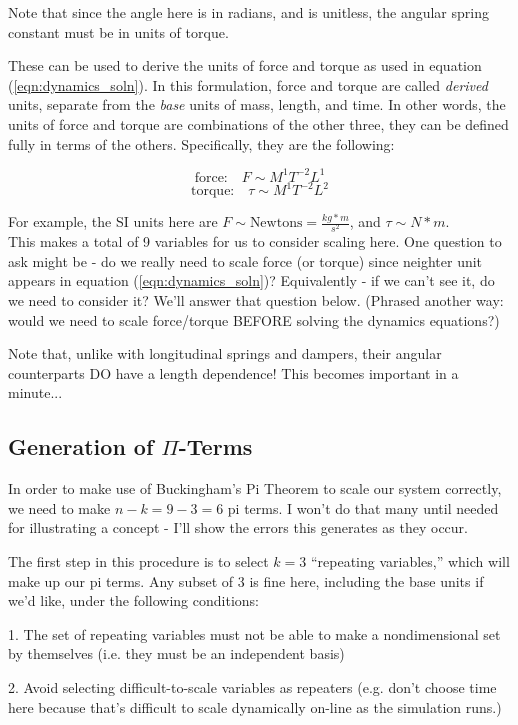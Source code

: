 \documentclass[12pt,letterpaper]{article}
\begin{document}
Note that since the angle here is in radians, and is unitless, the angular spring constant must be in units of torque.

These can be used to derive the units of force and torque as used in equation (\ref{eqn:dynamics_soln}).
In this formulation, force and torque are called {\it derived} units, separate from the {\it base} units of mass, length, and time.
In other words, the units of force and torque are combinations of the other three, they can be defined fully in terms of the others.
Specifically, they are the following:

\[
\text{force:} \quad F \sim M^1 T^{-2} L^1 
\]
\[
\text{torque:} \quad \tau \sim M^1 T^{-2} L^2 
\]

For example, the SI units here are $F \sim \text{Newtons} = \frac{kg*m}{s^2}$, and $\tau \sim N*m$. \\

This makes a total of 9 variables for us to consider scaling here.
One question to ask might be - do we really need to scale force (or torque) since neighter unit appears in equation (\ref{eqn:dynamics_soln})?
Equivalently - if we can't see it, do we need to consider it?
We'll answer that question below.
(Phrased another way: would we need to scale force/torque BEFORE solving the dynamics equations?)

Note that, unlike with longitudinal springs and dampers, their angular counterparts DO have a length dependence! This becomes important in a minute...

\subsection{Generation of $\Pi$-Terms}

In order to make use of Buckingham's Pi Theorem to scale our system correctly, we need to make $n-k = 9-3 = 6$ pi terms. I won't do that many until needed for illustrating a concept - I'll show the errors this generates as they occur.

The first step in this procedure is to select $k=3$ ``repeating variables,'' which will make up our pi terms. Any subset of 3 is fine here, including the base units if we'd like, under the following conditions:

1. The set of repeating variables must not be able to make a nondimensional set by themselves (i.e. they must be an independent basis)

2. Avoid selecting difficult-to-scale variables as repeaters (e.g. don't choose time here because that's difficult to scale dynamically on-line as the simulation runs.)
\end{document}
